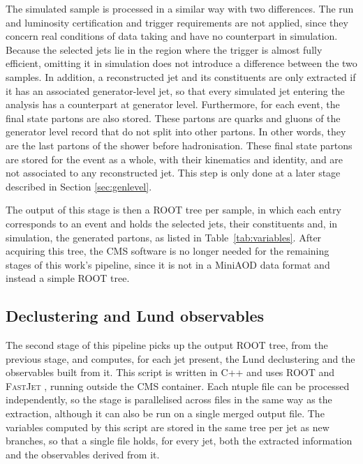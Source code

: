 The simulated sample is processed in a similar way with two differences. The run and luminosity
certification and trigger requirements are not applied, since they concern real conditions of 
data taking and have no counterpart in simulation. Because the
selected jets lie in the region where the trigger is almost fully efficient,
omitting it in simulation does not introduce a difference between the two
samples. In addition, a reconstructed jet and its constituents are only extracted if it has an associated
generator-level jet, so that every simulated jet entering the analysis has a
counterpart at generator level. Furthermore, for each event, the final state partons 
are also stored. These partons are quarks and gluons of the generator level record
that do not split into other partons. In other words, they are the last partons of the shower
before hadronisation. These final state partons are stored for the event as a whole,
with their kinematics and identity, and are not
associated to any reconstructed jet. This step is only done at a later stage described in
Section \ref{sec:genlevel}.

The output of this stage is then a ROOT tree per sample, in which each entry
corresponds to an event and holds the selected jets, their constituents and, in
simulation, the generated partons, as listed in Table~\ref{tab:variables}. After acquiring
this tree, the CMS software is no longer needed for the remaining stages of this work's pipeline,
since it is not in a MiniAOD data format and instead a simple ROOT tree.

\subsection{Declustering and Lund observables}
\label{sec:declustering-impl}

The second stage of this pipeline picks up the output ROOT tree, from the previous stage, and
computes, for each jet present, the Lund declustering and the observables built from it. 
This script is written in C++ and uses ROOT and \textsc{FastJet} \cite{Cacciari_2012}, running
outside the CMS container. Each ntuple file can be processed independently, so the
stage is parallelised across files in the same way as the extraction, although it can also
be run on a single merged output file. The variables computed by this script are stored
in the same tree per jet as new branches, so that a single file holds, for every jet, both the extracted information and the
observables derived from it.

